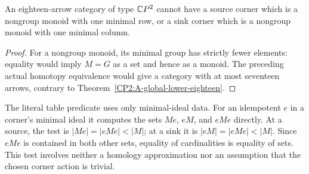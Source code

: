 \begin{corollary}
\label{CP2:A-extreme-minimal-group-eighteen}
An eighteen-arrow category of type $\mathbb{C}P^2$ cannot have
a source corner which is a nongroup monoid with one minimal
row, or a sink corner which is a nongroup monoid with one
minimal column.
\end{corollary}
\begin{proof}
For a nongroup monoid, its minimal group has strictly fewer
elements: equality would imply $M=G$ as a set and hence as
a monoid. The preceding actual homotopy equivalence would
give a category with at most seventeen arrows, contrary
to Theorem~\ref{CP2:A-global-lower-eighteen}.
\end{proof}

The literal table predicate uses only minimal-ideal data.
For an idempotent $e$ in a corner's minimal ideal it computes
the sets $Me$, $eM$, and $eMe$ directly. At a source, the
test is $|Me|=|eMe|<|M|$; at a sink it is
$|eM|=|eMe|<|M|$. Since $eMe$ is contained in both other
sets, equality of cardinalities is equality of sets.
This test involves neither a homology approximation nor
an assumption that the chosen corner action is trivial.
